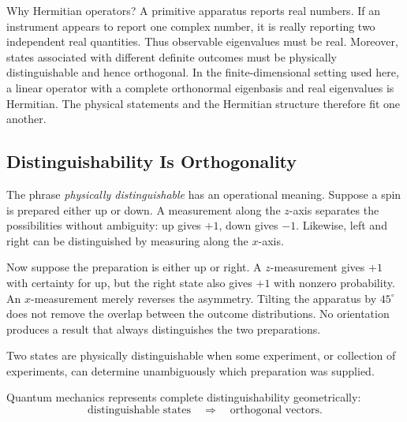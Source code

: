 Why Hermitian operators? A primitive apparatus reports real numbers. If an instrument appears to report one complex number, it is really reporting two independent real quantities. Thus observable eigenvalues must be real. Moreover, states associated with different definite outcomes must be physically distinguishable and hence orthogonal. In the finite-dimensional setting used here, a linear operator with a complete orthonormal eigenbasis and real eigenvalues is Hermitian. The physical statements and the Hermitian structure therefore fit one another.

\subsection{Distinguishability Is Orthogonality}

The phrase \emph{physically distinguishable} has an operational meaning. Suppose a spin is prepared either up or down. A measurement along the \(z\)-axis separates the possibilities without ambiguity: up gives \(+1\), down gives \(-1\). Likewise, left and right can be distinguished by measuring along the \(x\)-axis.

Now suppose the preparation is either up or right. A \(z\)-measurement gives \(+1\) with certainty for up, but the right state also gives \(+1\) with nonzero probability. An \(x\)-measurement merely reverses the asymmetry. Tilting the apparatus by \(45^\circ\) does not remove the overlap between the outcome distributions. No orientation produces a result that always distinguishes the two preparations.

\begin{definition}
Two states are physically distinguishable when some experiment, or collection of experiments, can determine unambiguously which preparation was supplied.
\end{definition}

Quantum mechanics represents complete distinguishability geometrically:
\begin{equation}
\text{distinguishable states}
\quad\Longrightarrow\quad
\text{orthogonal vectors}.
\end{equation}

\begin{classroomqa}
\end{classroomqa}

